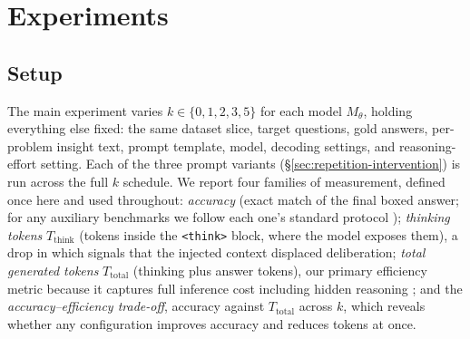 \section{Experiments}
\label{sec:experiments}

\subsection{Setup}
\label{sec:exp-setup}

The main experiment varies $k \in \{0,1,2,3,5\}$ for each model $M_\theta$, holding
everything else fixed: the same dataset slice, target questions, gold answers,
per-problem insight text, prompt template, model, decoding settings, and
reasoning-effort setting. Each of the three prompt variants
(\S\ref{sec:repetition-intervention}) is run across the full $k$ schedule. We report
four families of measurement, defined once here and used throughout:
\emph{accuracy} (exact match of the final boxed answer; for any auxiliary benchmarks
we follow each one's standard protocol \citep{suzgun2022bbh, tafjord2021proofwriter});
\emph{thinking tokens} $T_{\mathrm{think}}$ (tokens inside the \texttt{<think>} block,
where the model exposes them), a drop in which signals that the injected context
displaced deliberation; \emph{total generated tokens} $T_{\mathrm{total}}$ (thinking
plus answer tokens), our primary efficiency metric because it captures full inference
cost including hidden reasoning \citep{leviathan2025prompt}; and the
\emph{accuracy--efficiency trade-off}, accuracy against $T_{\mathrm{total}}$ across
$k$, which reveals whether any configuration improves accuracy and reduces tokens at
once.
